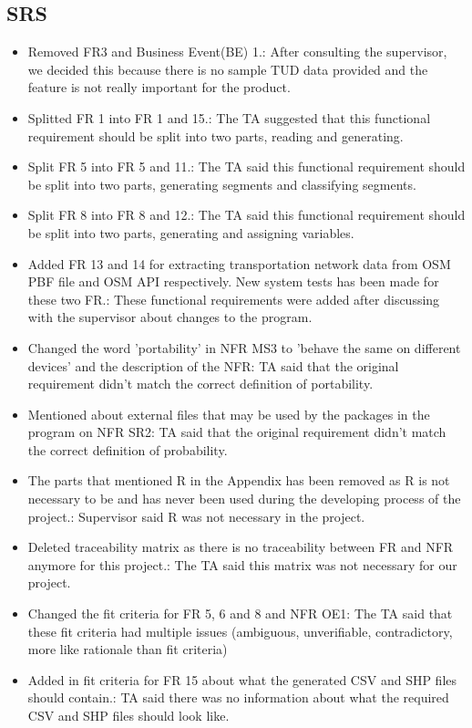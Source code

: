 \documentclass{article}
\begin{document}
\subsection{SRS}
\begin{itemize}
    \item Removed FR3 and Business Event(BE) 1.: After consulting the supervisor, we decided this because there is no sample TUD data provided and the feature is not really important for the product. 
    \item Splitted FR 1 into FR 1 and 15.: The TA suggested that this functional requirement should be split into two parts, reading and generating.
    \item Split FR 5 into FR 5 and 11.: The TA said this functional requirement should be split into two parts, generating segments and classifying segments.
    \item Split FR 8 into FR 8 and 12.: The TA said this functional requirement should be split into two parts, generating and assigning variables.
    \item Added FR 13 and 14 for extracting transportation network data from OSM PBF file and OSM API respectively. New system tests has been made for these two FR.: These functional requirements were added after discussing with the supervisor about changes to the program.
    \item Changed the word 'portability' in NFR MS3 to 'behave the same on different devices' and the description of the NFR: TA said that the original requirement didn't match the correct definition of portability.
    \item Mentioned about external files that may be used by the packages in the program on NFR SR2: TA said that the original requirement didn't match the correct definition of probability.
    \item The parts that mentioned R in the Appendix has been removed as R is not necessary to be and has never been used during the developing process of the project.: Supervisor said R was not necessary in the project.
    \item Deleted traceability matrix as there is no traceability between FR and NFR anymore for this project.: The TA said this matrix was not necessary for our project.
    \item Changed the fit criteria for FR 5, 6 and 8 and NFR OE1: The TA said that these fit criteria had multiple issues (ambiguous, unverifiable, contradictory, more like rationale than fit criteria)
    \item Added in fit criteria for FR 15 about what the generated CSV and SHP files should contain.: TA said there was no information about what the required CSV and SHP files should look like.
    
\end{itemize}
\end{document}
